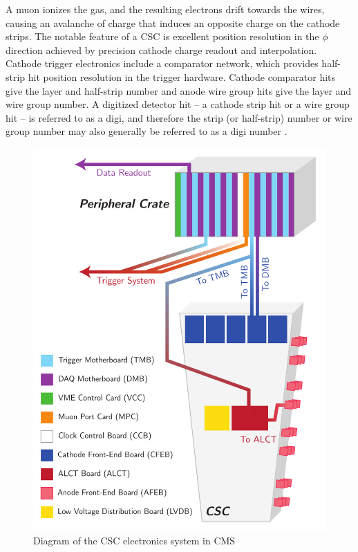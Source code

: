 A muon ionizes the gas, and the resulting electrons drift towards the wires, causing an avalanche of charge that induces an opposite charge on the cathode strips. The notable feature of a CSC is excellent position resolution in the $\phi$ direction achieved by precision cathode charge readout and interpolation. Cathode trigger electronics include a comparator network, which provides half-strip hit position resolution in the trigger hardware. Cathode comparator hits give the layer and half-strip number and anode wire group hits give the layer and wire group number. A digitized detector hit -- a cathode strip hit or a wire group hit -- is referred to as a digi, and therefore the strip (or half-strip) number or wire group number may also generally be referred to as a digi number \cite{Hauser:814259,Baarmand:1999ka,Acosta:200826}.

\begin{figure}[p]
	\centering
	\includegraphics[width=\dummyFigWidth]{figures/neutron/fig_CSC_electronics.pdf}
	\caption{Diagram of the CSC electronics system in CMS}
	\label{fig:CSC_electronics}
\end{figure}

